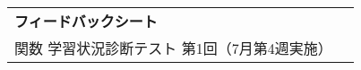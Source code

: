 \begin{table}[h]
    \begin{tabularx}{0.9\linewidth}{ll}
        \textbf{\Large フィードバックシート} & \\
        関数 学習状況診断テスト 第1回（7月第4週実施）&
    \end{tabularx}
\end{table}
